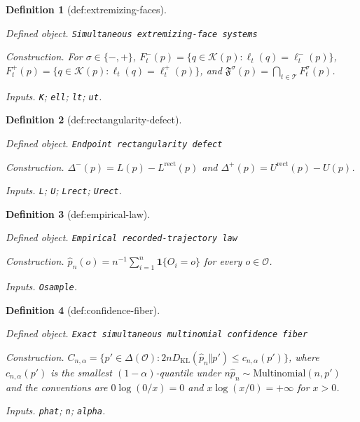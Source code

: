\documentclass{article}
\newtheorem{definition}{Definition}
\begin{document}
\begin{definition}[def:extremizing-faces]\label{def:extremizing-faces}
\par\smallskip\noindent\emph{Defined object.} \texttt{Simultaneous extremizing-\allowbreak{}face systems}
\par\smallskip\noindent\emph{Construction.} For \(\sigma\in\{-,+\}\), \(F_t^-(p)=\{q\in\mathcal K(p):\ell_t(q)=\ell_t^-(p)\}\), \(F_t^+(p)=\{q\in\mathcal K(p):\ell_t(q)=\ell_t^+(p)\}\), and \(\mathfrak F^\sigma(p)=\bigcap_{t\in\mathcal T}F_t^\sigma(p)\).
\par\smallskip\noindent\emph{Inputs.} \texttt{K}; \texttt{ell}; \texttt{lt}; \texttt{ut}.
\end{definition}

\begin{definition}[def:rectangularity-defect]\label{def:rectangularity-defect}
\par\smallskip\noindent\emph{Defined object.} \texttt{Endpoint rectangularity defect}
\par\smallskip\noindent\emph{Construction.} \(\Delta^-(p)=L(p)-L^{\mathrm{rect}}(p)\) and \(\Delta^+(p)=U^{\mathrm{rect}}(p)-U(p)\).
\par\smallskip\noindent\emph{Inputs.} \texttt{L}; \texttt{U}; \texttt{Lrect}; \texttt{Urect}.
\end{definition}

\begin{definition}[def:empirical-law]\label{def:empirical-law}
\par\smallskip\noindent\emph{Defined object.} \texttt{Empirical recorded-\allowbreak{}trajectory law}
\par\smallskip\noindent\emph{Construction.} \(\widehat p_n(o)=n^{-1}\sum_{i=1}^n\mathbf 1\{O_i=o\}\) for every \(o\in\mathcal O\).
\par\smallskip\noindent\emph{Inputs.} \texttt{Osample}.
\end{definition}

\begin{definition}[def:confidence-fiber]\label{def:confidence-fiber}
\par\smallskip\noindent\emph{Defined object.} \texttt{Exact simultaneous multinomial confidence fiber}
\par\smallskip\noindent\emph{Construction.} \(C_{n,\alpha}=\{p'\in\Delta(\mathcal O):2nD_{\mathrm{KL}}(\widehat p_n\Vert p')\le c_{n,\alpha}(p')\}\), where \(c_{n,\alpha}(p')\) is the smallest \((1-\alpha)\)-quantile under \(n\widehat p_n\sim\mathrm{Multinomial}(n,p')\) and the conventions are \(0\log(0/x)=0\) and \(x\log(x/0)=+\infty\) for \(x>0\).
\par\smallskip\noindent\emph{Inputs.} \texttt{phat}; \texttt{n}; \texttt{alpha}.
\end{definition}
\end{document}
